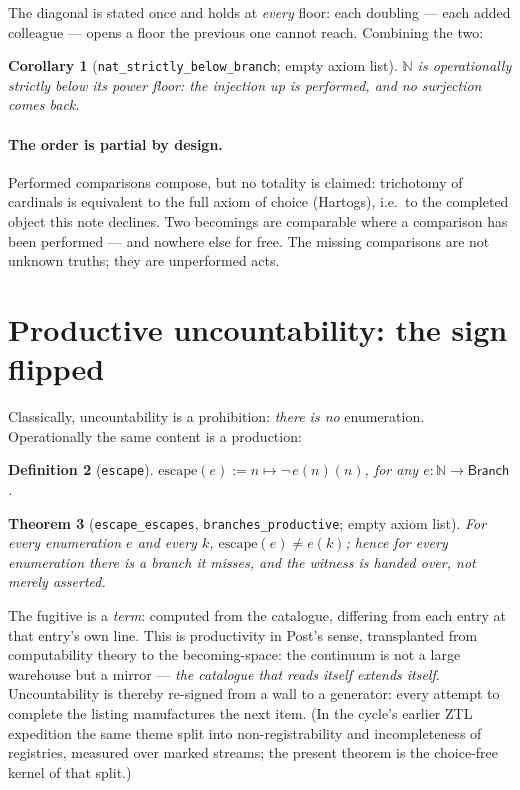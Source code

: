 \documentclass[11pt]{article}
\newtheorem{thm}{Theorem}[section]
\newtheorem{defn}[thm]{Definition}
\newtheorem{cor}[thm]{Corollary}
\theoremstyle{remark}
\newcommand{\N}{\mathbb{N}}
\newcommand{\Branch}{\textsf{Branch}}
\begin{document}
The diagonal is stated once and holds at \emph{every} floor: each
doubling --- each added colleague --- opens a floor the previous one
cannot reach.  Combining the two:

\begin{cor}[\texttt{nat\_strictly\_below\_branch}; empty axiom list]
$\N$ is operationally strictly below its power floor: the injection up
is performed, and no surjection comes back.
\end{cor}

\paragraph{The order is partial by design.}  Performed comparisons
compose, but no totality is claimed: trichotomy of cardinals is
equivalent to the full axiom of choice (Hartogs), i.e.\ to the completed
object this note declines.  Two becomings are comparable where a
comparison has been performed --- and nowhere else for free.  The
missing comparisons are not unknown truths; they are unperformed acts.

\section{Productive uncountability: the sign flipped}
\label{sec:productive}

Classically, uncountability is a prohibition: \emph{there is no}
enumeration.  Operationally the same content is a production:

\begin{defn}[\texttt{escape}]
$\mathrm{escape}(e) := n \mapsto \lnot\, e(n)(n)$, for any
$e : \N \to \Branch$.
\end{defn}

\begin{thm}[\texttt{escape\_escapes}, \texttt{branches\_productive};
empty axiom list]
For every enumeration $e$ and every $k$,
$\mathrm{escape}(e) \ne e(k)$; hence for every enumeration there
\emph{is} a branch it misses, and the witness is handed over, not merely
asserted.
\end{thm}

The fugitive is a \emph{term}: computed from the catalogue, differing
from each entry at that entry's own line.  This is productivity in
Post's sense, transplanted from computability theory to the
becoming-space: the continuum is not a large warehouse but a mirror ---
\emph{the catalogue that reads itself extends itself}.  Uncountability
is thereby re-signed from a wall to a generator: every attempt to
complete the listing manufactures the next item.  (In the cycle's
earlier ZTL expedition the same theme split into non-registrability and
incompleteness of registries, measured over marked streams; the present
theorem is the choice-free kernel of that split.)
\end{document}
